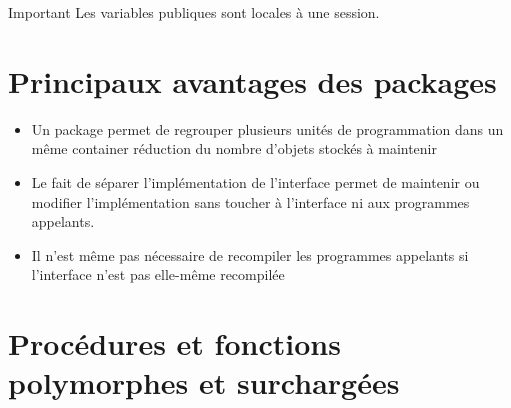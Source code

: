 \documentclass[10pt]{beamer}
\begin{document}
\begin{frame}{\secname}
    \begin{alertblock}{Important}
        Les variables publiques sont locales à une session.
    \end{alertblock}
\end{frame}

\section{Principaux avantages des packages}
\begin{frame}{\secname}
    \begin{itemize}
        \item Un package permet de regrouper plusieurs unités de programmation dans un même container réduction du nombre d'objets stockés à maintenir
        \item Le fait de séparer l'implémentation de l'interface permet de maintenir ou modifier l'implémentation sans toucher à l'interface ni aux programmes appelants.
        \item Il n'est même pas nécessaire de recompiler les programmes appelants si l'interface n'est pas elle-même recompilée
    \end{itemize}
\end{frame}

\section{Procédures et fonctions polymorphes et surchargées}
\begin{frame}{\secname}
    
\end{frame}

\begin{frame}[allowframebreaks]{\secname}
    
\end{frame}


\end{document}
